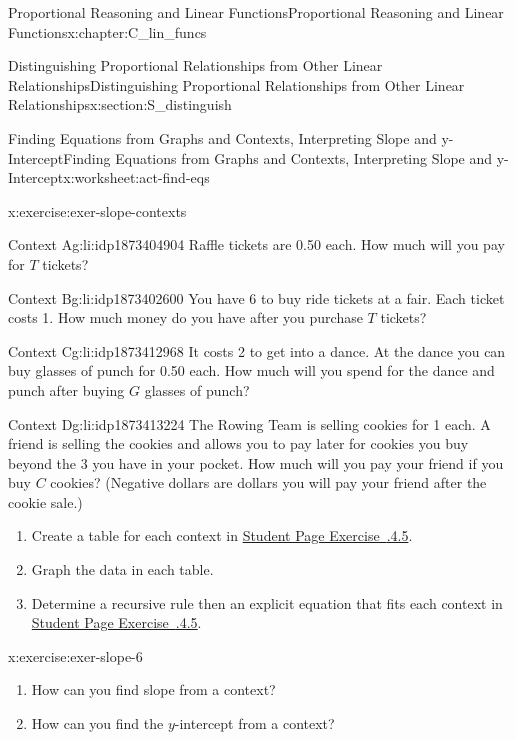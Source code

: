 \documentclass[oneside,10pt,]{book}
\newcommand{\xreffont}{\relax}
\numberwithin{equation}{chapter}
\begin{document}
\begin{chapterptx}{Proportional Reasoning and Linear Functions}{}{Proportional Reasoning and Linear Functions}{}{}{x:chapter:C_lin_funcs}
\begin{sectionptx}{Distinguishing Proportional Relationships from Other Linear Relationships}{}{Distinguishing Proportional Relationships from Other Linear Relationships}{}{}{x:section:S_distinguish}
\begin{worksheet-subsection}{Finding Equations from Graphs and Contexts, Interpreting Slope and y-Intercept}{}{Finding Equations from Graphs and Contexts, Interpreting Slope and y-Intercept}{}{}{x:worksheet:act-find-eqs}
\begin{divisionexercise}{5}{}{}{x:exercise:exer-slope-contexts}
\begin{descriptionlist}
\begin{dlimedium}{Context A}{g:li:idp1873404904}%
Raffle tickets are \textdollar{}0.50 each. How much will you pay for \(T\) tickets?%
\end{dlimedium}%
\begin{dlimedium}{Context B}{g:li:idp1873402600}%
You have \textdollar{}6 to buy ride tickets at a fair. Each ticket costs \textdollar{}1. How much money do you have after you purchase \(T\) tickets?%
\end{dlimedium}%
\begin{dlimedium}{Context C}{g:li:idp1873412968}%
It costs \textdollar{}2 to get into a dance. At the dance you can buy glasses of punch for \textdollar{}0.50 each. How much will you spend for the dance and punch after buying \(G\) glasses of punch?%
\end{dlimedium}%
\begin{dlimedium}{Context D}{g:li:idp1873413224}%
The Rowing Team is selling cookies for \textdollar{}1 each. A friend is selling the cookies and allows you to pay later for cookies you buy beyond the \textdollar{}3 you have in your pocket. How much will you pay your friend if you buy \(C\) cookies? (Negative dollars are dollars you will pay your friend after the cookie sale.)%
\end{dlimedium}%
\end{descriptionlist}
%
\begin{enumerate}[font=\bfseries,label=(\alph*),ref=\alph*]
\item{}Create a table for each context in \hyperlink{x:exercise:exer-slope-contexts}{Student Page Exercise~{\xreffont 2.6.4.5}}.%
\item{}Graph the data in each table.%
\item{}Determine a recursive rule then an explicit equation that fits each context in \hyperlink{x:exercise:exer-slope-contexts}{Student Page Exercise~{\xreffont 2.6.4.5}}.%
\end{enumerate}
\end{divisionexercise}%
\begin{divisionexercise}{6}{}{}{x:exercise:exer-slope-6}%
\begin{enumerate}[font=\bfseries,label=(\alph*),ref=\alph*]
\item{}How can you find slope from a context?%
\item{}How can you find the \(y\)-intercept from a context?%

\end{enumerate}
\end{divisionexercise}
\end{worksheet-subsection}
\end{sectionptx}
\end{chapterptx}
\end{document}
